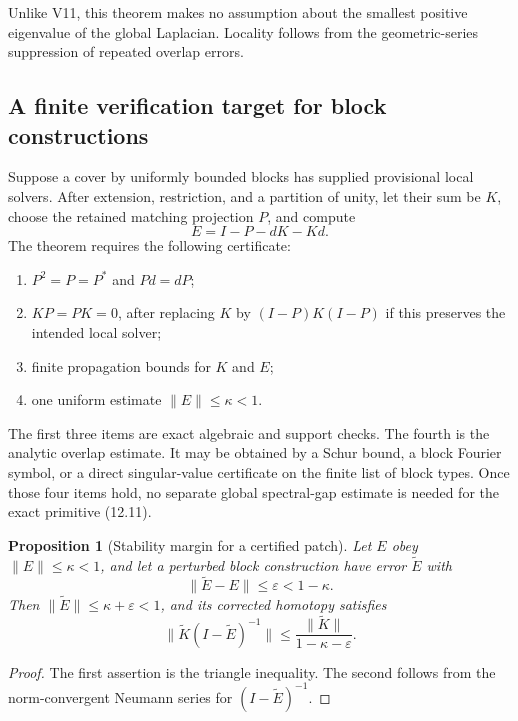 \documentclass[11pt]{article}
\newtheorem{proposition}[theorem]{Proposition}
\theoremstyle{remark}
\begin{document}
Unlike V11, this theorem makes no assumption about the smallest
positive eigenvalue of the global Laplacian.  Locality follows from
the geometric-series suppression of repeated overlap errors.

\subsection{A finite verification target for block constructions}

Suppose a cover by uniformly bounded blocks has supplied provisional
local solvers.  After extension, restriction, and a partition of
unity, let their sum be \(K\), choose the retained matching
projection \(P\), and compute
\[
                         E=I-P-dK-Kd.                       \tag{12.20}
\]
The theorem requires the following certificate:

\begin{enumerate}
\item \(P^2=P=P^*\) and \(Pd=dP\);
\item \(KP=PK=0\), after replacing \(K\) by
      \((I-P)K(I-P)\) if this preserves the intended local solver;
\item finite propagation bounds for \(K\) and \(E\);
\item one uniform estimate \(\|E\|\le\kappa<1\).
\end{enumerate}

The first three items are exact algebraic and support checks.  The
fourth is the analytic overlap estimate.  It may be obtained by a
Schur bound, a block Fourier symbol, or a direct singular-value
certificate on the finite list of block types.  Once those four
items hold, no separate global spectral-gap estimate is needed for
the exact primitive (12.11).

\begin{proposition}[Stability margin for a certified patch]
\label{prop:v12v12-stability}
Let \(E\) obey \(\|E\|\le\kappa<1\), and let a perturbed block
construction have error \(\widetilde E\) with
\[
                         \|\widetilde E-E\|\le\varepsilon
                         <1-\kappa.                         \tag{12.21}
\]
Then \(\|\widetilde E\|\le\kappa+\varepsilon<1\), and its corrected
homotopy satisfies
\[
 \|\widetilde K(I-\widetilde E)^{-1}\|
 \le\frac{\|\widetilde K\|}{1-\kappa-\varepsilon}.          \tag{12.22}
\]
\end{proposition}

\begin{proof}
The first assertion is the triangle inequality.  The second follows
from the norm-convergent Neumann series for
\((I-\widetilde E)^{-1}\).
\end{proof}
\end{document}
